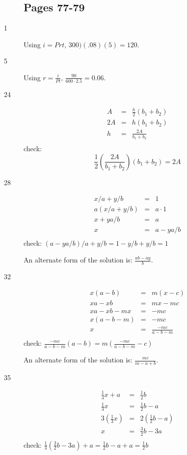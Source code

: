 \documentclass{exam}
\begin{document}
\begin{description}
\subsection{Pages 77-79}

\item[1] Using \(i = Prt\), \(300)(.08)(5) = 120 \).

\item[5] Using \(r = \frac{i}{Pt}\), \(\frac{90}{600 \cdot 2.5} = 0.06 \).

\item[24]
\begin{eqnarray*}
  A &=& \frac{h}{2} (b_1 + b_2) \\
  2A &=& h(b_1 + b_2) \\
  h &=& \frac{2A}{b_1 + b_2} \\
\end{eqnarray*}
check:
\[
 \frac{1}{2} \left( \frac{2A}{b_1 + b_2} \right) (b_1 + b_2) = 2A 
\]

\item[28]
\begin{eqnarray*}
  x/a + y/b &=& 1 \\
  a(x/a + y/b) &=& a \cdot 1  \\
  x + ya/b &=& a  \\
  x &=& a - ya/b \\
\end{eqnarray*}
check: \( (a - ya/b)/a + y/b = 1 - y/b + y/b = 1 \)

An alternate form of the solution is: \( \displaystyle \frac{ab -ay}{b} \).

\item[32]
\begin{eqnarray*}
  x(a-b) &=& m(x-c) \\
  xa-xb &=& mx-mc \\
  xa-xb-mx &=& -mc \\
  x(a-b-m) &=& -mc \\
  x &=& \frac{-mc}{a-b-m} \\
\end{eqnarray*}
check: \( \frac{-mc}{a-b-m} (a-b) = m \left( \frac{-mc}{a-b-m} - c \right) \)

An alternate form of the solution is: \( \displaystyle \frac{mc}{m - a + b} \).

\item[35]
\begin{eqnarray*}
  \frac{1}{3}x + a &=& \frac{1}{2}b \\
  \frac{1}{3}x &=& \frac{1}{2}b - a \\
  3(\frac{1}{3}x) &=& 2(\frac{1}{2}b - a) \\
  x &=& \frac{3}{2}b - 3a \\
\end{eqnarray*}
check: \( \frac{1}{3} \left( \frac{3}{2}b - 3a \right) + a = \frac{1}{2}b - a + a = \frac{1}{2}b \)


\end{description}
\end{document}
